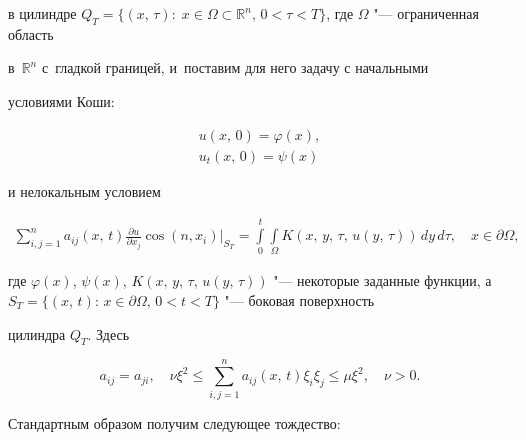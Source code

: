 в цилиндре $Q_{T}=\{(x,\, \tau):\;  x\in\Omega\subset \mathbb R^n,\,


0<{\tau}<T \}$, где $\Omega$ "--- ограниченная область


в~$\mathbb R^n$ с~гладкой границей, и~поставим для него задачу с начальными


условиями Коши:


\begin{eqnarray}


\label{dmitr:g2} u(x,\, 0)=\varphi(x),\\


\label{dmitr:g3} u_{t}(x,\,0)=\psi(x)


\end{eqnarray}


и нелокальным условием


\begin{eqnarray}


\label{dmitr:g4} \sum\limits_{i,j=1}^n a_{ij}(x,\,t)


\frac{\partial u}{\partial x_j}\cos(n,x_i)\Big|_{S_T}=\int\limits_0^t\int\limits_{\Omega}K(x,\, y,\, \tau,\, u(y,\, \tau))\,dy\,d\tau,


\quad x\in\partial\Omega,


\end{eqnarray}


где $\varphi(x)$, $\psi(x)$, $K(x,\,y,\,\tau,\,u(y,\,\tau))$ "--- некоторые заданные функции, а~$S_{T}=\{(x,\, t):\, x\in\partial\Omega,\, 0<t<T\}$ "--- боковая поверхность


цилиндра $Q_{T}$. Здесь


$$


a_{ij}=a_{ji},\quad\nu\xi^2\le \sum\limits_{i,j=1}^n a_{ij}(x,\, t)\xi_i\xi_j\le


\mu\xi^2,\quad \nu>0.


$$





Стандартным образом получим следующее тождество:


